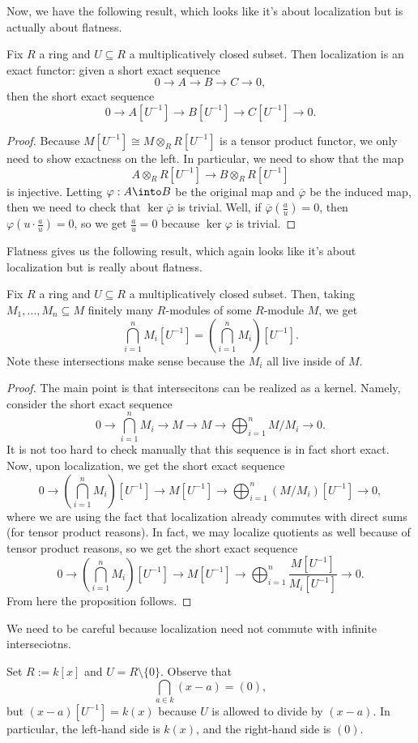 Now, we have the following result, which looks like it's about localization but is actually about flatness.
\begin{proposition}
	Fix $R$ a ring and $U\subseteq R$ a multiplicatively closed subset. Then localization is an exact functor: given a short exact sequence
	\[0\to A\to B\to C\to 0,\]
	then the short exact sequence
	\[0\to A\left[U^{-1}\right]\to B\left[U^{-1}\right]\to C\left[U^{-1}\right]\to 0.\]
\end{proposition}
\begin{proof}
	Because $M\left[U^{-1}\right]\cong M\otimes_RR\left[U^{-1}\right]$ is a tensor product functor, we only need to show exactness on the left. In particular, we need to show that the map
	\[A\otimes_RR\left[U^{-1}\right]\to B\otimes_RR\left[U^{-1}\right]\]
	is injective. Letting $\varphi:A\into B$ be the original map and $\overline\varphi$ be the induced map, then we need to check that $\ker\overline\varphi$ is trivial.
	Well, if $\overline\varphi\left(\frac au\right)=0$, then $\varphi\left(u\cdot\frac au\right)=0$,
	so we get $\frac au=0$ because $\ker\varphi$ is trivial.
\end{proof}
Flatness gives us the following result, which again looks like it's about localization but is really about flatness.
\begin{corollary}
	Fix $R$ a ring and $U\subseteq R$ a multiplicatively closed subset. Then, taking $M_1,\ldots,M_n\subseteq M$ finitely many $R$-modules of some $R$-module $M$, we get
	\[\bigcap_{i=1}^nM_i\left[U^{-1}\right]=\left(\bigcap_{i=1}^nM_i\right)\left[U^{-1}\right].\]
	Note these intersections make sense because the $M_i$ all live inside of $M$.
\end{corollary}
\begin{proof}
	The main point is that intersecitons can be realized as a kernel. Namely, consider the short exact sequence
	\[0\to\bigcap_{i=1}^nM_i\to M\to M\to\bigoplus_{i=1}^nM/M_i\to 0.\]
	It is not too hard to check manually that this sequence is in fact short exact. Now, upon localization, we get the short exact sequence
	\[0\to\left(\bigcap_{i=1}^nM_i\right)\left[U^{-1}\right]\to M\left[U^{-1}\right]\to\bigoplus_{i=1}^n(M/M_i)\left[U^{-1}\right]\to0,\]
	where we are using the fact that localization already commutes with direct sums (for tensor product reasons). In fact, we may localize quotients as well because of tensor product reasons, so we get the short exact sequence
	\[0\to\left(\bigcap_{i=1}^nM_i\right)\left[U^{-1}\right]\to M\left[U^{-1}\right]\to\bigoplus_{i=1}^n\frac{M\left[U^{-1}\right]}{M_i\left[U^{-1}\right]}\to0.\]
	From here the proposition follows.
\end{proof}
We need to be careful because localization need not commute with infinite interseciotns.
\begin{example}
	Set $R:=k[x]$ and $U=R\setminus\{0\}$. Observe that
	\[\bigcap_{a\in k}(x-a)=(0),\]
	but $(x-a)\left[U^{-1}\right]=k(x)$ because $U$ is allowed to divide by $(x-a)$. In particular, the left-hand side is $k(x)$, and the right-hand side is $(0)$.
\end{example}

